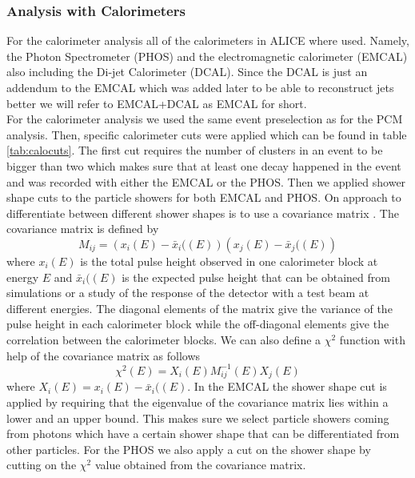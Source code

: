 \subsubsection{Analysis with Calorimeters}
For the calorimeter analysis all of the calorimeters in ALICE where used. Namely, the Photon Spectrometer (PHOS) and the electromagnetic calorimeter (EMCAL) also including the Di-jet Calorimeter (DCAL). Since the DCAL is just an addendum to the EMCAL which was added later to be able to reconstruct jets better we will refer to EMCAL+DCAL as EMCAL for short. \\
For the calorimeter analysis we used the same event preselection as for the PCM analysis. Then, specific calorimeter cuts were applied which can be found in table \ref{tab:calocuts}. The first cut requires the number of clusters in an event to be bigger than two which makes sure that at least one decay happened in the event and was recorded with either the EMCAL or the PHOS. Then we applied shower shape cuts to the particle showers for both EMCAL and PHOS. On approach to differentiate between different shower shapes is to use a covariance matrix \cite{CaloCovMat}. The covariance matrix is defined by
\begin{equation}
M_{ij} = \left( x_i(E) - \bar{x}_i((E) \right)\left( x_j(E) - \bar{x}_j((E) \right)
\end{equation}
where $x_i(E)$ is the total pulse height observed in one calorimeter block at energy $E$ and $\bar{x}_i((E)$ is the expected pulse height that can be obtained from simulations or a study of the response of the detector with a test beam at different energies. The diagonal elements of the matrix give the variance of the pulse height in each calorimeter block while the off-diagonal elements give the correlation between the calorimeter blocks. We can also define a $\chi^2$ function with help of the covariance matrix as follows
\begin{equation}
\chi^2(E) = X_i(E) M_{ij}^{-1}(E) X_j(E)
\end{equation}
where $X_i(E) = x_i(E) - \bar{x}_i((E)$.
In the EMCAL the shower shape cut is applied by requiring that the eigenvalue of the covariance matrix lies within a lower and an upper bound. This makes sure we select particle showers coming from photons which have a certain shower shape that can be differentiated from other particles. For the PHOS we also apply a cut on the shower shape by cutting on the $\chi^2$ value obtained from the covariance matrix. \\
\\
